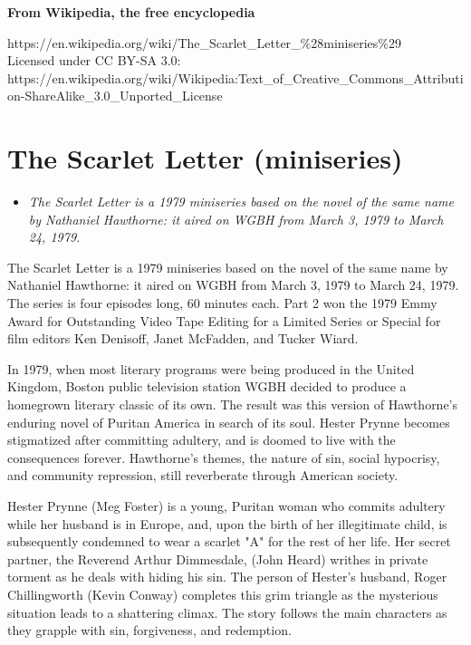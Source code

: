 \textbf{From Wikipedia, the free encyclopedia}

https://en.wikipedia.org/wiki/The\_Scarlet\_Letter\_\%28miniseries\%29\\
Licensed under CC BY-SA 3.0:\\
https://en.wikipedia.org/wiki/Wikipedia:Text\_of\_Creative\_Commons\_Attribution-ShareAlike\_3.0\_Unported\_License

\section{The Scarlet Letter
(miniseries)}\label{the-scarlet-letter-miniseries}

\begin{itemize}
\item
  \emph{The Scarlet Letter is a 1979 miniseries based on the novel of
  the same name by Nathaniel Hawthorne: it aired on WGBH from March 3,
  1979 to March 24, 1979.}
\end{itemize}

The Scarlet Letter is a 1979 miniseries based on the novel of the same
name by Nathaniel Hawthorne: it aired on WGBH from March 3, 1979 to
March 24, 1979. The series is four episodes long, 60 minutes each. Part
2 won the 1979 Emmy Award for Outstanding Video Tape Editing for a
Limited Series or Special for film editors Ken Denisoff, Janet McFadden,
and Tucker Wiard.

In 1979, when most literary programs were being produced in the United
Kingdom, Boston public television station WGBH decided to produce a
homegrown literary classic of its own. The result was this version of
Hawthorne's enduring novel of Puritan America in search of its soul.
Hester Prynne becomes stigmatized after committing adultery, and is
doomed to live with the consequences forever. Hawthorne's themes, the
nature of sin, social hypocrisy, and community repression, still
reverberate through American society.

Hester Prynne (Meg Foster) is a young, Puritan woman who commits
adultery while her husband is in Europe, and, upon the birth of her
illegitimate child, is subsequently condemned to wear a scarlet "A" for
the rest of her life. Her secret partner, the Reverend Arthur
Dimmesdale, (John Heard) writhes in private torment as he deals with
hiding his sin. The person of Hester's husband, Roger Chillingworth
(Kevin Conway) completes this grim triangle as the mysterious situation
leads to a shattering climax. The story follows the main characters as
they grapple with sin, forgiveness, and redemption.

